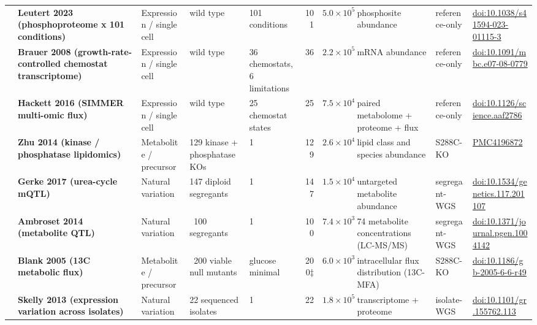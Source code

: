 \begin{landscape}
\begin{longtable}{@{}r@{\hspace{4pt}} L{42mm} L{21mm} L{26mm} L{20mm} r@{\hspace{5pt}} r@{\hspace{5pt}} L{30mm} L{23mm} L{34mm}@{}}
 & \textbf{Leutert 2023 (phosphoproteome x 101 conditions)} & Expression / single cell & wild type & 101 conditions & 101 & $5.0\times 10^{5}$ & phosphosite abundance & reference-\allowbreak only & \href{https://doi.org/10.1038/s41594-023-01115-3}{doi:10.1038/\allowbreak s41594-023-01115-3} \\
 & \textbf{Brauer 2008 (growth-rate-controlled chemostat transcriptome)} & Expression / single cell & wild type & 36 chemostats, 6 limitations & 36 & $2.2\times 10^{5}$ & mRNA abundance & reference-\allowbreak only & \href{https://doi.org/10.1091/mbc.e07-08-0779}{doi:10.1091/\allowbreak mbc.e07-08-0779} \\
 & \textbf{Hackett 2016 (SIMMER multi-omic flux)} & Expression / single cell & wild type & 25 chemostat states & 25 & $7.5\times 10^{4}$ & paired metabolome + proteome + flux & reference-\allowbreak only & \href{https://doi.org/10.1126/science.aaf2786}{doi:10.1126/\allowbreak science.aaf2786} \\
 & \textbf{Zhu 2014 (kinase / phosphatase lipidomics)} & Metabolite / precursor & 129 kinase + phosphatase KOs & 1 & 129 & $2.6\times 10^{4}$ & lipid class and species abundance & S288C-\allowbreak KO & \href{https://pmc.ncbi.nlm.nih.gov/articles/PMC4196872/}{PMC4196872} \\
 & \textbf{Gerke 2017 (urea-cycle mQTL)} & Natural variation & 147 diploid segregants & 1 & 147 & $1.5\times 10^{4}$ & untargeted metabolite abundance & segregant-\allowbreak WGS & \href{https://doi.org/10.1534/genetics.117.201107}{doi:10.1534/\allowbreak genetics.117.201107} \\
 & \textbf{Ambroset 2014 (metabolite QTL)} & Natural variation & ~100 segregants & 1 & 100 & $7.4\times 10^{3}$ & 74 metabolite concentrations (LC-MS/MS) & segregant-\allowbreak WGS & \href{https://doi.org/10.1371/journal.pgen.1004142}{doi:10.1371/\allowbreak journal.pgen.1004142} \\
 & \textbf{Blank 2005 (13C metabolic flux)} & Metabolite / precursor & ~200 viable null mutants & glucose minimal & 200$\ddagger$ & $6.0\times 10^{3}$ & intracellular flux distribution (13C-MFA) & S288C-\allowbreak KO & \href{https://doi.org/10.1186/gb-2005-6-6-r49}{doi:10.1186/\allowbreak gb-2005-6-6-r49} \\
 & \textbf{Skelly 2013 (expression variation across isolates)} & Natural variation & 22 sequenced isolates & 1 & 22 & $1.8\times 10^{5}$ & transcriptome + proteome & isolate-\allowbreak WGS & \href{https://doi.org/10.1101/gr.155762.113}{doi:10.1101/\allowbreak gr.155762.113} \\

\end{longtable}
\end{landscape}
